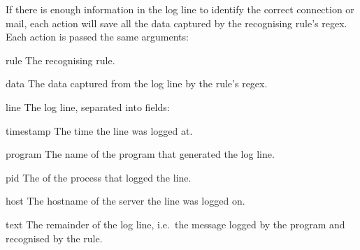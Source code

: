 If there is enough information in the log line to identify the correct
connection or mail, each action will save all the data captured by the
recognising rule's regex.  Each action is passed the same arguments:

\begin{boldeqlist}

    \squeezeitems{}

    \item [rule] The recognising rule.

    \item [data] The data captured from the log line by the rule's regex.

    \item [line] The log line, separated into fields:

        \begin{boldeqlist}

            \squeezeitems{}

            \item [timestamp] The time the line was logged at.

            \item [program] The name of the program that generated the log
                line.

            \item [pid] The  of the process that logged the
                line.

            \item [host] The hostname of the server the line was logged on.

            \item [text] The remainder of the log line, i.e.\ the message
                logged by the program and recognised by the rule.

        \end{boldeqlist}

\end{boldeqlist}

